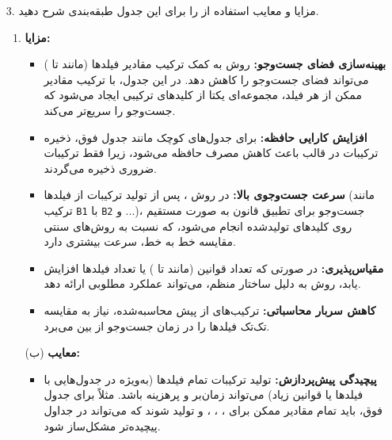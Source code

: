 \begin{enumerate}
	\item [3. ]
	مزایا و معایب استفاده از  را برای این جدول طبقه‌بندی شرح دهید.
	\begin{qsolve}
		\begin{enumerate}
			\item \textbf{مزایا:}
			\begin{itemize}
				\item \textbf{بهینه‌سازی فضای جست‌وجو:}
				روش  به کمک ترکیب مقادیر فیلدها (مانند  تا ) می‌تواند فضای جست‌وجو را کاهش دهد. در این جدول، با ترکیب مقادیر ممکن از هر فیلد، مجموعه‌ای یکتا از کلیدهای ترکیبی ایجاد می‌شود که جست‌وجو را سریع‌تر می‌کند.
				
				\item \textbf{افزایش کارایی حافظه:}
				برای جدول‌های کوچک مانند جدول فوق، ذخیره ترکیبات در قالب  باعث کاهش مصرف حافظه می‌شود، زیرا فقط ترکیبات ضروری ذخیره می‌گردند.
			\end{itemize}
			
		\end{enumerate}
	\end{qsolve}
	\newpage
	\begin{qsolve}
		\begin{enumerate}
			\item [ ]
			\begin{itemize}
				\item \textbf{سرعت جست‌وجوی بالا:}
				در روش ، پس از تولید ترکیبات از فیلدها (مانند ترکیب \texttt{B1} با \texttt{B2} و ...)، جست‌وجو برای تطبیق قانون به صورت مستقیم روی کلیدهای تولید‌شده انجام می‌شود، که نسبت به روش‌های سنتی مقایسه خط به خط، سرعت بیشتری دارد.
				
				
				\item \textbf{مقیاس‌پذیری:}
				در صورتی که تعداد قوانین (مانند  تا ) یا تعداد فیلدها افزایش یابد، روش  به دلیل ساختار منظم، می‌تواند عملکرد مطلوبی ارائه دهد.
				
				\item \textbf{کاهش سربار محاسباتی:}
				ترکیب‌های از پیش محاسبه‌شده، نیاز به مقایسه تک‌تک فیلدها را در زمان جست‌وجو از بین می‌برد.
			\end{itemize}
			
			
			\item [(ب)]
			\textbf{معایب:}
			\begin{itemize}
				\item \textbf{پیچیدگی پیش‌پردازش:}
				تولید ترکیبات تمام فیلدها (به‌ویژه در جدول‌هایی با فیلدها یا قوانین زیاد) می‌تواند زمان‌بر و پرهزینه باشد. مثلاً برای جدول فوق، باید تمام مقادیر ممکن برای ، ، ، و  تولید شوند که می‌تواند در جداول پیچیده‌تر مشکل‌ساز شود.
				

\end{itemize}
\end{enumerate}
\end{qsolve}
\end{enumerate}
